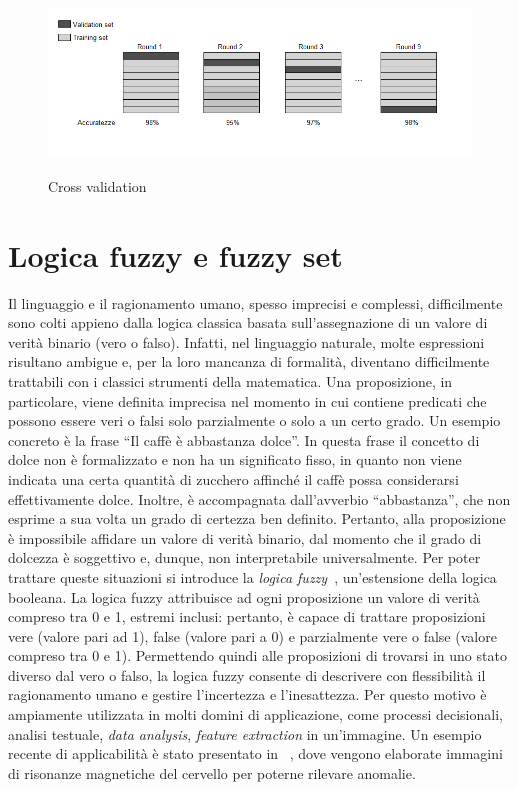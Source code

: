 \documentclass[11pt,  oneside, openany]{book}
\begin{document}
\begin{figure}[h!]
\begin{center}
  \includegraphics[width=13cm]{Immagini/Crossvalidation.png}\\
  \caption{Cross validation}
\end{center}
\end{figure}

	\section{Logica fuzzy e fuzzy set}
Il linguaggio e il ragionamento umano, spesso imprecisi e complessi, difficilmente sono colti appieno dalla logica classica basata sull'assegnazione di un valore di verità binario (vero o falso). Infatti, nel linguaggio naturale, molte espressioni risultano ambigue e, per la loro mancanza di formalità, diventano difficilmente trattabili con i classici strumenti della matematica. Una proposizione, in particolare, viene definita imprecisa nel momento in cui contiene predicati che possono essere veri o falsi solo parzialmente o solo a un certo grado. Un esempio concreto è la frase ``Il caffè è abbastanza dolce''. In questa frase il concetto di dolce non è formalizzato e non ha un significato fisso, in quanto non viene indicata una certa quantità di zucchero affinché il caffè possa considerarsi effettivamente dolce. Inoltre, è accompagnata dall'avverbio ``abbastanza'', che non esprime a sua volta un grado di certezza ben definito. Pertanto, alla proposizione è impossibile affidare un valore di verità binario, dal momento che il grado di dolcezza è soggettivo e, dunque, non interpretabile universalmente. Per poter trattare queste situazioni si introduce la \textit{logica fuzzy}~\cite{fuzzylogicintro}, un'estensione della logica booleana. La logica fuzzy attribuisce ad ogni proposizione un valore di verità compreso tra 0 e 1, estremi inclusi: pertanto, è capace di trattare proposizioni vere (valore pari ad 1), false (valore pari a 0) e parzialmente vere o false (valore compreso tra 0 e 1). Permettendo quindi alle proposizioni di trovarsi in uno stato diverso dal vero o falso, la logica fuzzy consente di descrivere con flessibilità il ragionamento umano e gestire l'incertezza e l'inesattezza. Per questo motivo è ampiamente utilizzata in molti domini di applicazione, come processi decisionali, analisi testuale, \textit{data analysis}, \textit{feature extraction} in un'immagine. Un esempio recente di applicabilità è stato presentato in ~\cite{fuzzybraintumor}, dove vengono elaborate immagini di risonanze magnetiche del cervello per poterne rilevare anomalie. 
\end{document}
